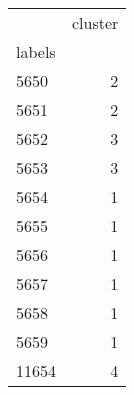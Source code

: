 \begin{tabular}{lr}
\toprule
{} &  cluster \\
labels &          \\
\midrule
5650   &        2 \\
5651   &        2 \\
5652   &        3 \\
5653   &        3 \\
5654   &        1 \\
5655   &        1 \\
5656   &        1 \\
5657   &        1 \\
5658   &        1 \\
5659   &        1 \\
11654  &        4 \\
\bottomrule
\end{tabular}
